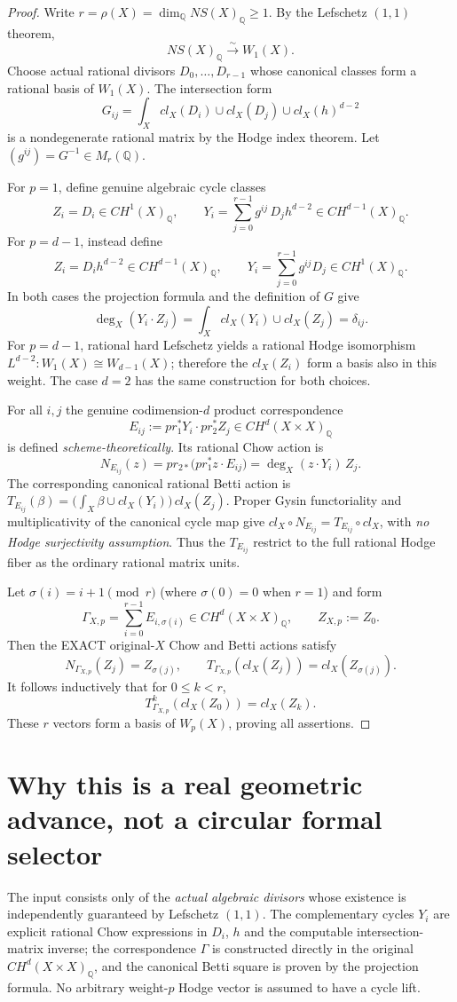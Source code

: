 \documentclass[11pt]{article}
\begin{document}
\begin{proof}
Write $r=\rho(X)=\dim_{\mathbb Q}NS(X)_{\mathbb Q}\ge1$.
By the Lefschetz $(1,1)$ theorem,
\[
NS(X)_{\mathbb Q}\xrightarrow{\sim}W_1(X).
\]
Choose actual rational divisors $D_0,\ldots,D_{r-1}$ whose
canonical classes form a rational basis of $W_1(X)$.
The intersection form
\[
G_{ij}=\int_X cl_X(D_i)\cup cl_X(D_j)\cup cl_X(h)^{d-2}
\]
is a nondegenerate rational matrix by the Hodge index theorem.
Let $(g^{ij})=G^{-1}\in M_r(\mathbb Q)$.

For $p=1$, define genuine algebraic cycle classes
\[
Z_i=D_i\in CH^1(X)_{\mathbb Q},\qquad
Y_i=\sum_{j=0}^{r-1}g^{ij}\,D_jh^{d-2}
  \in CH^{d-1}(X)_{\mathbb Q}.
\]
For $p=d-1$, instead define
\[
Z_i=D_ih^{d-2}\in CH^{d-1}(X)_{\mathbb Q},\qquad
Y_i=\sum_{j=0}^{r-1}g^{ij}D_j\in CH^1(X)_{\mathbb Q}.
\]
In both cases the projection formula and the definition of $G$ give
\[
\deg_X(Y_i\cdot Z_j)
=\int_X cl_X(Y_i)\cup cl_X(Z_j)=\delta_{ij}.
\]
For $p=d-1$, rational hard Lefschetz yields a rational Hodge
isomorphism $L^{d-2}:W_1(X)\cong W_{d-1}(X)$;
therefore the $cl_X(Z_i)$ form a basis also in this weight.
The case $d=2$ has the same construction for both choices.

For all $i,j$ the genuine codimension-$d$ product correspondence
\[
E_{ij}:=pr_1^*Y_i\cdot pr_2^*Z_j
\in CH^d(X\times X)_{\mathbb Q}
\]
is defined \emph{scheme-theoretically}. Its rational Chow action is
\[
N_{E_{ij}}(z)
=pr_{2*}\bigl(pr_1^*z\cdot E_{ij}\bigr)
=\deg_X(z\cdot Y_i)\,Z_j.
\]
The corresponding canonical rational Betti action is
$T_{E_{ij}}(\beta)=
\bigl(\int_X\beta\cup cl_X(Y_i)\bigr)\,cl_X(Z_j)$.
Proper Gysin functoriality and multiplicativity of the canonical
cycle map give
$cl_X\circ N_{E_{ij}}=T_{E_{ij}}\circ cl_X$,
with \emph{no Hodge surjectivity assumption}.
Thus the $T_{E_{ij}}$ restrict to the full rational Hodge fiber
as the ordinary rational matrix units.

Let $\sigma(i)=i+1\pmod r$ (where $\sigma(0)=0$ when $r=1$) and form
\[
\boxed{\Gamma_{X,p}=
\sum_{i=0}^{r-1} E_{i,\sigma(i)}
\in CH^d(X\times X)_{\mathbb Q},\qquad
Z_{X,p}:=Z_0.}
\]
Then the EXACT original-$X$ Chow and Betti actions satisfy
\[
N_{\Gamma_{X,p}}(Z_j)=Z_{\sigma(j)},\qquad
T_{\Gamma_{X,p}}(cl_X(Z_j))=cl_X(Z_{\sigma(j)}).
\]
It follows inductively that for $0\le k<r$,
\[
T_{\Gamma_{X,p}}^k(cl_X(Z_0))=cl_X(Z_k).
\]
These $r$ vectors form a basis of $W_p(X)$, proving all assertions.
\end{proof}

\section{Why this is a real geometric advance, not a circular formal selector}
The input consists only of the \emph{actual algebraic divisors} whose
existence is independently guaranteed by Lefschetz $(1,1)$.
The complementary cycles $Y_i$ are explicit rational Chow expressions
in $D_i$, $h$ and the computable intersection-matrix inverse;
the correspondence $\Gamma$ is constructed directly in the original
$CH^d(X\times X)_{\mathbb Q}$, and the canonical Betti square is
proven by the projection formula.
No arbitrary weight-$p$ Hodge vector is assumed to have a cycle lift.
\end{document}
